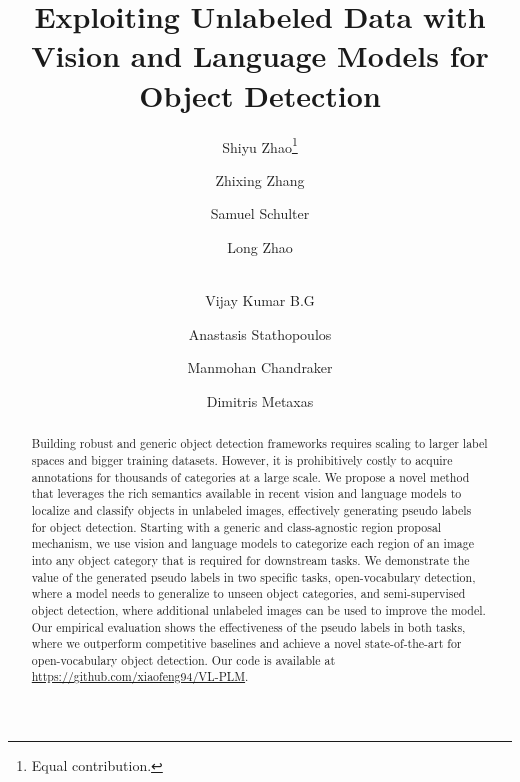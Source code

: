 \documentclass[runningheads]{llncs}
\begin{document}
\pagestyle{headings}
\mainmatter
\def\ECCVSubNumber{xxxx}  

\title{Exploiting Unlabeled Data with Vision and Language Models for Object Detection} 

\begin{comment}
\titlerunning{ECCV-22 submission ID \ECCVSubNumber} 
\authorrunning{ECCV-22 submission ID \ECCVSubNumber} 
\author{Anonymous ECCV submission}
\institute{Paper ID \ECCVSubNumber}
\end{comment}


\author{Shiyu Zhao\thanks{Equal contribution.} \and
Zhixing Zhang \and
Samuel Schulter \and 
Long Zhao \and \\
Vijay Kumar B.G \and 
Anastasis Stathopoulos \and 
Manmohan Chandraker \and 
Dimitris Metaxas
}

\maketitle

\begin{abstract}
    Building robust and generic object detection frameworks requires scaling to larger label spaces and bigger training datasets. However, it is prohibitively costly to acquire annotations for thousands of categories at a large scale.  We propose a novel method that leverages the rich semantics available in recent vision and language models to localize and classify objects in unlabeled images, effectively generating pseudo labels for object detection.  Starting with a generic and class-agnostic region proposal mechanism, we use vision and language models to categorize each region of an image into any object category that is required for downstream tasks.  We demonstrate the value of the generated pseudo labels in two specific tasks, open-vocabulary detection, where a model needs to generalize to unseen object categories, and semi-supervised object detection, where additional unlabeled images can be used to improve the model.  Our empirical evaluation shows the effectiveness of the pseudo labels in both tasks, where we outperform competitive baselines and achieve a novel state-of-the-art for open-vocabulary object detection. Our code is available at \url{https://github.com/xiaofeng94/VL-PLM}.
\end{abstract}
\end{document}
